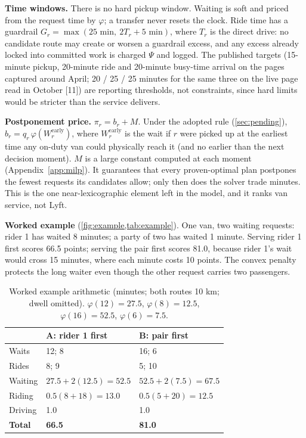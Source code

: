 \documentclass{article}
\begin{document}
\textbf{Time windows.} There is no hard pickup window. Waiting is soft and priced from the request time by $\varphi$; a transfer never resets the clock. Ride time has a guardrail $G_r = \max(25\text{ min},\ 2T_r + 5\text{ min})$, where $T_r$ is the direct drive: no candidate route may create or worsen a guardrail excess, and any excess already locked into committed work is charged $\Psi$ and logged. The published targets (15-minute pickup, 20-minute ride and 20-minute busy-time arrival on the pages captured around April; 20 / 25 / 25 minutes for the same three on the live page read in October [11]) are reporting thresholds, not constraints, since hard limits would be stricter than the service delivers.

\textbf{Postponement price.} $\pi_r = b_r + M$. Under the adopted rule (\cref{sec:pending}), $b_r = q_r\,\varphi(W_r^{\mathrm{early}})$, where $W_r^{\mathrm{early}}$ is the wait if $r$ were picked up at the earliest time any on-duty van could physically reach it (and no earlier than the next decision moment). $M$ is a large constant computed at each moment (Appendix~\ref{app:milp}). It guarantees that every proven-optimal plan postpones the fewest requests its candidates allow; only then does the solver trade minutes. This is the one near-lexicographic element left in the model, and it ranks van service, not Lyft.

\textbf{Worked example} (\cref{fig:example,tab:example}). One van, two waiting requests: rider 1 has waited 8 minutes; a party of two has waited 1 minute. Serving rider 1 first scores 66.5 points; serving the pair first scores 81.0, because rider 1's wait would cross 15 minutes, where each minute costs 10 points. The convex penalty protects the long waiter even though the other request carries two passengers.



\begin{table}[t]
\centering\small
\caption{Worked example arithmetic (minutes; both routes 10 km; dwell omitted). $\varphi(12)=27.5$, $\varphi(8)=12.5$, $\varphi(16)=52.5$, $\varphi(6)=7.5$.}\label{tab:example}
\begin{tabularx}{\columnwidth}{@{}P{1.35cm}LL@{}}
\toprule
 & \textbf{A: rider 1 first} & \textbf{B: pair first}\\
\midrule
Waits & 12; 8 & 16; 6\\
Rides & 8; 9 & 5; 10\\
Waiting & $27.5 + 2(12.5) = 52.5$ & $52.5 + 2(7.5) = 67.5$\\
Riding & $0.5(8 + 18) = 13.0$ & $0.5(5 + 20) = 12.5$\\
Driving & 1.0 & 1.0\\
\midrule
\textbf{Total} & \textbf{66.5} & \textbf{81.0}\\
\bottomrule
\end{tabularx}
\end{table}
\end{document}
